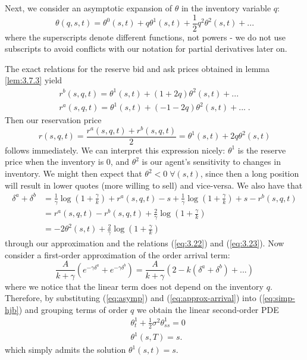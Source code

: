 Next, we consider an asymptotic expansion of $\theta$ in the inventory variable $q$:
\begin{equation}\label{eq:asymp}
    \theta(q,s,t)=\theta^0(s,t)+q\theta^1(s,t)+\frac{1}{2}q^2\theta^2(s,t)+...
\end{equation}
where the superscripts denote different functions, not powers - we do not use subscripts
to avoid conflicts with our notation for partial derivatives later on.

The exact relations for the reserve bid and ask prices obtained in lemma \ref{lem:3.7.3}
yield
\begin{gather}
    r^b(s,q,t)=\theta^1(s,t)+(1+2q)\theta^2(s,t)+...\\
    r^a(s,q,t)=\theta^1(s,t)+(-1-2q)\theta^2(s,t)+...\;.
\end{gather}
Then our reservation price
\begin{equation}\label{eq:reserve-price}
    r(s,q,t)=\frac{r^a(s,q,t)+r^b(s,q,t)}{2}=\theta^1(s,t)+2q\theta^2(s,t)
\end{equation}
follows immediately. We can interpret this expression nicely: $\theta^1$ is the reserve
price when the inventory is 0, and $\theta^2$ is our agent's sensitivity to changes in 
inventory. We might then expect that $\theta^2 < 0\;\forall(s,t)$, since then a long 
position will result in lower quotes (more willing to sell) and vice-versa. We also 
have that
\begin{equation}\label{eq:spread}
    \begin{aligned}
        \delta^a+\delta^b&=\frac{1}{\gamma}\log\left(1+\frac{\gamma}{k}\right)+r^a(s,q,t)-s+\frac{1}{\gamma}\log\left(1+\frac{\gamma}{k}\right)+s-r^b(s,q,t)\\
        &=r^a(s,q,t)-r^b(s,q,t)+\frac{2}{\gamma}\log\left(1+\frac{\gamma}{k}\right)\\
        &=-2\theta^2(s,t)+\frac{2}{\gamma}\log\left(1+\frac{\gamma}{k}\right)
    \end{aligned}
\end{equation}
through our approximation and the relations (\ref{eq:3.22}) and (\ref{eq:3.23}).
Now consider a first-order approximation of the order arrival term:
\begin{equation}\label{eq:approx-arrival}
    \frac{A}{k+\gamma}(e^{-\gamma\delta^a}+e^{-\gamma\delta^b})=\frac{A}{k+\gamma}(2-k(\delta^a+\delta^b)+...)
\end{equation}
where we notice that the linear term does not depend on the inventory $q$. Therefore,
by substituting (\ref{eq:asymp}) and (\ref{eq:approx-arrival}) into (\ref{eq:simp-hjb}) 
and grouping terms of order $q$ we obtain the linear second-order PDE
\begin{equation}\label{eq:3.32}
    \begin{aligned} 
        &\theta^1_t+\frac{1}{2}\sigma^2\theta^1_{ss}=0\\
        &\theta^1(s,T)=s.
    \end{aligned}
\end{equation}
which simply admits the solution $\theta^1(s,t)=s$. 


